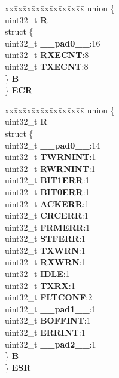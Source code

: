 \begin{DoxyCompactItemize}
\begin{tabbing}
\end{tabbing}\item 
\mbox{\label{structFLEXCAN2__tag_a87394a056b2aedb8808a8af9bc61ad21}} 
\begin{tabbing}
xx\=xx\=xx\=xx\=xx\=xx\=xx\=xx\=xx\=\kill
union \{\\
\>uint32\_t {\bfseries R}\\
\>struct \{\\
\>\>uint32\_t {\bfseries \_\_pad0\_\_}:16\\
\>\>uint32\_t {\bfseries RXECNT}:8\\
\>\>uint32\_t {\bfseries TXECNT}:8\\
\>\} {\bfseries B}\\
\} {\bfseries ECR}\\

\end{tabbing}\item 
\mbox{\label{structFLEXCAN2__tag_abfdb2dec19b06a109845683db2a9a1b3}} 
\begin{tabbing}
xx\=xx\=xx\=xx\=xx\=xx\=xx\=xx\=xx\=\kill
union \{\\
\>uint32\_t {\bfseries R}\\
\>struct \{\\
\>\>uint32\_t {\bfseries \_\_pad0\_\_}:14\\
\>\>uint32\_t {\bfseries TWRNINT}:1\\
\>\>uint32\_t {\bfseries RWRNINT}:1\\
\>\>uint32\_t {\bfseries BIT1ERR}:1\\
\>\>uint32\_t {\bfseries BIT0ERR}:1\\
\>\>uint32\_t {\bfseries ACKERR}:1\\
\>\>uint32\_t {\bfseries CRCERR}:1\\
\>\>uint32\_t {\bfseries FRMERR}:1\\
\>\>uint32\_t {\bfseries STFERR}:1\\
\>\>uint32\_t {\bfseries TXWRN}:1\\
\>\>uint32\_t {\bfseries RXWRN}:1\\
\>\>uint32\_t {\bfseries IDLE}:1\\
\>\>uint32\_t {\bfseries TXRX}:1\\
\>\>uint32\_t {\bfseries FLTCONF}:2\\
\>\>uint32\_t {\bfseries \_\_pad1\_\_}:1\\
\>\>uint32\_t {\bfseries BOFFINT}:1\\
\>\>uint32\_t {\bfseries ERRINT}:1\\
\>\>uint32\_t {\bfseries \_\_pad2\_\_}:1\\
\>\} {\bfseries B}\\
\} {\bfseries ESR}\\


\end{tabbing}
\end{DoxyCompactItemize}
